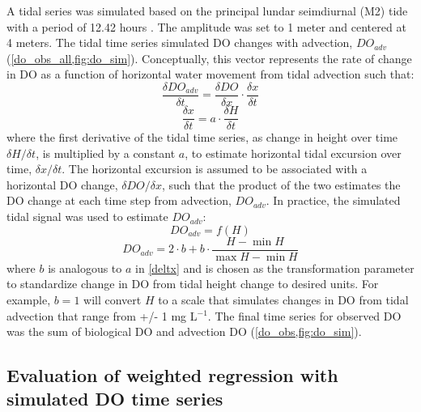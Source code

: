 \documentclass[letterpaper,12pt,oneside]{article}\usepackage[]{graphicx}\usepackage[]{color}
\begin{document}
A tidal series was simulated based on the principal lundar seimdiurnal (M2) tide with a period of 12.42 hours \citep{Foreman89}.  The amplitude was set to 1 meter and centered  at 4 meters.  The tidal time series simulated \ac{DO} changes with advection, $DO_{adv}$ (\cref{do_obs_all,fig:do_sim}). Conceptually, this vector represents the rate of change in \ac{DO} as a function of horizontal water movement from tidal advection such that:
\begin{equation} \label{deltdo}
\frac{\delta DO_{adv}}{\delta t} = \frac{\delta DO}{\delta x} \cdot \frac{\delta x}{\delta t}
\end{equation}
\begin{equation} \label{deltx}
\frac{\delta x}{\delta t} = a \cdot \frac{\delta H}{\delta t}
\end{equation}
where the first derivative of the tidal time series, as change in height over time $\delta H / \delta t$, is multiplied by a constant $a$, to estimate horizontal tidal excursion over time, $\delta x / \delta t$.  The horizontal excursion is assumed to be associated with a horizontal \ac{DO} change, $\delta DO / \delta x$, such that the product of the two estimates the \ac{DO} change at each time step from advection, $DO_{adv}$. In practice, the simulated tidal signal was used to estimate $DO_{adv}$:
\begin{equation} \label{do_advp}
DO_{adv} = f\left(H\right)
\end{equation}
\begin{equation} \label{do_adv}
DO_{adv} = 2\cdot b + b \cdot \frac{H- \min H}{\max H - \min H}
\end{equation}
where $b$ is analogous to $a$ in \cref{deltx} and is chosen as the transformation parameter to standardize change in \ac{DO} from tidal height change to desired units.  For example, $b = 1$ will convert $H$ to a scale that simulates changes in \ac{DO} from tidal advection that range from +/- 1 mg L$^{-1}$.  The final time series for observed \ac{DO} was the sum of biological \ac{DO} and advection \ac{DO} (\cref{do_obs,fig:do_sim}).

\subsection{Evaluation of weighted regression with simulated \ac{DO} time series}
\end{document}
